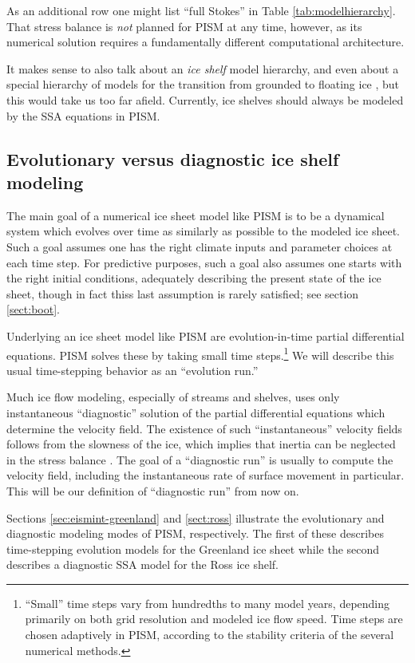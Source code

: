 \documentclass[11pt,final]{amsart}
\newcommand{\ind}[1]{\index{general}{#1}}
\begin{document}
As an additional row one might list ``full Stokes'' in Table \ref{tab:modelhierarchy}.  That stress balance is \emph{not} planned for PISM at any time, however, as its numerical solution requires a fundamentally different computational architecture.

It makes sense to also talk about an \emph{ice shelf} model hierarchy, and even about a special hierarchy of models for the transition from grounded to floating ice \cite{SchoofMarine1}, but this would take us too far afield.  Currently, ice shelves should always be modeled by the SSA equations in PISM.


\subsection{Evolutionary versus diagnostic ice shelf modeling} \label{subsect:basicmodes}\ind{PISM!evolution run}\ind{PISM!diagnostic run}    The main goal of a numerical ice sheet model like PISM is to be a dynamical system which evolves over time as similarly as possible to the modeled ice sheet.  Such a goal assumes one has the right climate inputs and parameter choices at each time step.  For predictive purposes, such a goal also assumes one starts with the right initial conditions, adequately describing the present state of the ice sheet, though in fact thiss last assumption is rarely satisfied; see section \ref{sect:boot}.

Underlying an ice sheet model like PISM are evolution-in-time partial differential equations.  PISM solves these by taking small time steps.\footnote{``Small'' time steps vary from hundredths to many model years, depending primarily on both grid resolution and modeled ice flow speed.  Time steps are chosen adaptively in PISM, according to the stability criteria of the several numerical methods.}  We will describe this usual time-stepping behavior as an ``evolution run.''

Much ice flow modeling, especially of streams and shelves, uses only instantaneous ``diagnostic'' solution of the partial differential equations which determine the velocity field.  The existence of such ``instantaneous'' velocity fields follows from the slowness of the ice, which implies that inertia can be neglected in the stress balance \cite{Fowler}.  The goal of a ``diagnostic run'' is usually to compute the velocity field, including the instantaneous rate of surface movement in particular.  This will be our definition of ``diagnostic run'' from now on.

Sections \ref{sec:eismint-greenland} and \ref{sect:ross} illustrate the evolutionary and diagnostic modeling modes of PISM, respectively.  The first of these describes time-stepping evolution models for the Greenland ice sheet while the second describes a diagnostic SSA model for the Ross ice shelf.
\end{document}
